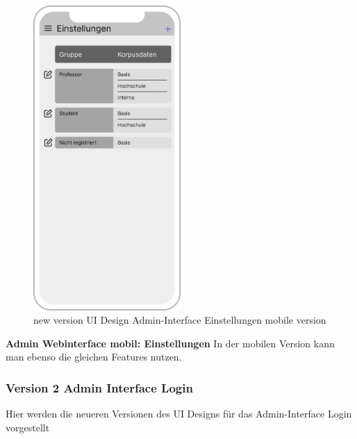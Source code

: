 \begin{figure}[H]
    \centering
    \includegraphics[width=0.5\textwidth]{bilder/new vers. UI Design/Einstellungen/iPhone X Einstellungen I (1).png}
    \caption{new version UI Design Admin-Interface Einstellungen mobile version}
    \label{fig:new version UI Design Admin-Interface Einstellungen mobile version}
\end{figure}
\noindent \textbf{Admin Webinterface mobil: Einstellungen} \newline
In der mobilen Version kann man ebenso die gleichen Features nutzen.

\subsubsection{Version 2 Admin Interface Login}
Hier werden die neueren Versionen des UI Designs für das Admin-Interface Login vorgestellt

